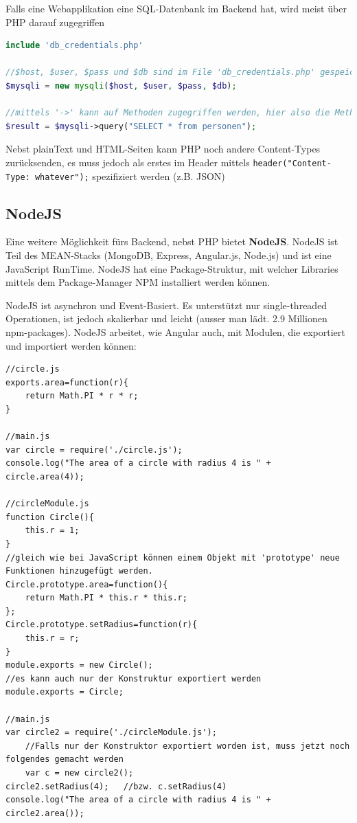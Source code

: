 \documentclass[a4paper, 11pt]{article}
\newcommand{\code}[1]{\texttt{#1}}
\begin{document}
\vspace{10px}

\noindent Falls eine Webapplikation eine SQL-Datenbank im Backend hat, wird meist über PHP darauf zugegriffen

\begin{lstlisting}[language=php]
include 'db_credentials.php'

//$host, $user, $pass und $db sind im File 'db_credentials.php' gespeichert
$mysqli = new mysqli($host, $user, $pass, $db);

//mittels '->' kann auf Methoden zugegriffen werden, hier also die Methode 'query' vom mysqli-Objekt
$result = $mysqli->query("SELECT * from personen");

\end{lstlisting}

Nebst plainText und HTML-Seiten kann PHP noch andere Content-Types zurücksenden, es muss jedoch als erstes im Header mittels \code{header("Content-Type: whatever");} spezifiziert werden (z.B. JSON)

\newpage

\subsection{NodeJS}
Eine weitere Möglichkeit fürs Backend, nebst PHP bietet \textbf{NodeJS}. NodeJS ist Teil des MEAN-Stacks (MongoDB, Express, Angular.js, Node.js) und ist eine JavaScript RunTime. NodeJS hat eine Package-Struktur, mit welcher Libraries mittels dem Package-Manager NPM installiert werden können.
\vspace{10px}

\noindent NodeJS ist asynchron und Event-Basiert. Es unterstützt nur single-threaded Operationen, ist jedoch skalierbar und leicht (ausser man lädt. 2.9 Millionen npm-packages). NodeJS arbeitet, wie Angular auch, mit Modulen, die exportiert und importiert werden können:

\begin{lstlisting}
//circle.js
exports.area=function(r){
	return Math.PI * r * r;
}

//main.js
var circle = require('./circle.js');
console.log("The area of a circle with radius 4 is " + circle.area(4));

//circleModule.js
function Circle(){
	this.r = 1;
}
//gleich wie bei JavaScript können einem Objekt mit 'prototype' neue Funktionen hinzugefügt werden.
Circle.prototype.area=function(){
	return Math.PI * this.r * this.r;
};
Circle.prototype.setRadius=function(r){
	this.r = r;
}
module.exports = new Circle();
//es kann auch nur der Konstruktur exportiert werden
module.exports = Circle;

//main.js
var circle2 = require('./circleModule.js');
	//Falls nur der Konstruktor exportiert worden ist, muss jetzt noch folgendes gemacht werden
	var c = new circle2();
circle2.setRadius(4);	//bzw. c.setRadius(4)
console.log("The area of a circle with radius 4 is " + circle2.area());
\end{lstlisting}
\end{document}
